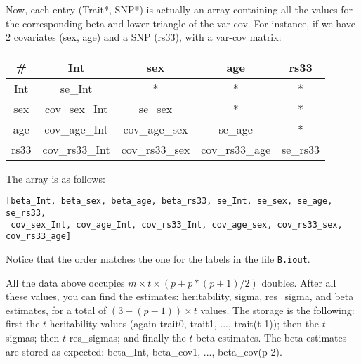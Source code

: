 \documentclass[a4paper,10pt]{article}
\begin{document}

\vspace{15mm}
\noindent
Now, each entry (Trait*, SNP*) is actually an array containing all the values for the 
corresponding beta and lower triangle of the var-cov. For instance, if we have 2 covariates
(sex, age) and a SNP (rs33), with a var-cov matrix:

\vspace{5mm}
\begin{tabular}{| c | c  c  c  c |} \hline
	\# & Int & sex & age & rs33 \\\hline
	Int &  se\_Int & * & * & * \\
	sex &  cov\_sex\_Int & se\_sex & * & * \\
	age &  cov\_age\_Int & cov\_age\_sex & se\_age & * \\
	rs33 & cov\_rs33\_Int & cov\_rs33\_sex & cov\_rs33\_age & se\_rs33 \\\hline
\end{tabular}


\vspace{5mm}
\noindent
The array is as follows:

\begin{verbatim}
[beta_Int, beta_sex, beta_age, beta_rs33, se_Int, se_sex, se_age, se_rs33, 
 cov_sex_Int, cov_age_Int, cov_rs33_Int, cov_age_sex, cov_rs33_sex, cov_rs33_age]
\end{verbatim}

\vspace{1mm}
\noindent
Notice that the order matches the one for the labels in the file {\tt B.iout}.


\vspace{5mm}
\noindent
All the data above occupies $m \times t \times (p + p*(p+1)/2)$ doubles. After all these values,
you can find the estimates: heritability, sigma, res\_sigma, and beta estimates, 
for a total of $(3 + (p-1)) \times t$ values. The storage is the following: 
first the $t$ heritability values (again trait0, trait1, ..., trait(t-1));
then the $t$ sigmas; then $t$ res\_sigmas; and finally the $t$ beta estimates.
The beta estimates are stored as expected: beta\_Int, beta\_cov1, ..., beta\_cov(p-2).
\end{document}
